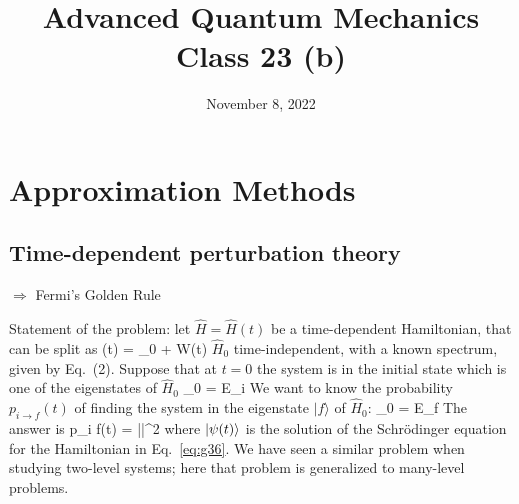 \documentclass[12pt]{article}
\title{Advanced Quantum Mechanics\\Class 23 (b)}
\date{November 8, 2022}                                           %
\begin{document}
\maketitle

\setcounter{section}{6}
\setcounter{equation}{35}

\section{Approximation Methods}

\setcounter{subsection}{1}
\subsection{Time-dependent perturbation theory}

$\Rightarrow$ Fermi's Golden Rule

Statement of the problem: let $\hat{H} = \hat{H}(t)$ be a time-dependent Hamiltonian,
that can be split as
\be
{}(t) = _0 + \lambda W(t)
\label{eq:g36}
\ee
$\hat{H}_0$ time-independent, with a known spectrum, given
by Eq.~(2). Suppose that at $t=0$ the system is
in the initial state
\be
{} \equiv {}
\ee
which is one of the eigenstates of $\hat{H}_0$
\be
{}_0  = E_i 
\ee
We want to know the probability $p_{i \rightarrow f}(t)$ of finding
the system in the eigenstate $|f\rangle$ of $\hat{H}_{0}$:
\be
{}_0  = E_f 
\ee
The answer is
\be
p_{i \rightarrow f}(t) = ||^2
\label{eq:g40}
\ee
where $\ket{\psi(t)}$ is the solution of the Schrödinger equation
for the Hamiltonian in Eq.~\eqref{eq:g36}.
We have seen a similar problem when
studying two-level systems; here that
problem is generalized to many-level problems.
\end{document}
